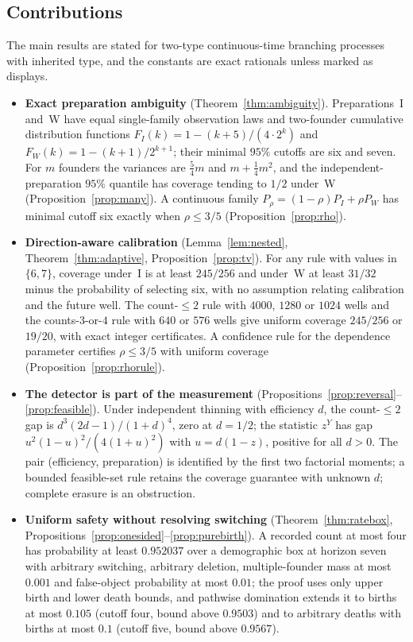 \documentclass[11pt,a4paper]{article}
\theoremstyle{plain}
\theoremstyle{definition}
\theoremstyle{remark}
\begin{document}
\subsection{Contributions}
The main results are stated for two-type continuous-time branching processes with inherited type, and the constants are exact rationals unless marked as displays.
\begin{itemize}
\item \textbf{Exact preparation ambiguity} (Theorem~\ref{thm:ambiguity}). Preparations~I and~W have equal single-family observation laws and two-founder cumulative distribution functions $F_I(k)=1-(k+5)/(4\cdot2^k)$ and $F_W(k)=1-(k+1)/2^{k+1}$; their minimal $95\%$ cutoffs are six and seven. For $m$ founders the variances are $\tfrac54 m$ and $m+\tfrac14 m^2$, and the independent-preparation $95\%$ quantile has coverage tending to $1/2$ under~W (Proposition~\ref{prop:many}). A continuous family $P_\rho=(1-\rho)P_I+\rho P_W$ has minimal cutoff six exactly when $\rho\le3/5$ (Proposition~\ref{prop:rho}).
\item \textbf{Direction-aware calibration} (Lemma~\ref{lem:nested}, Theorem~\ref{thm:adaptive}, Proposition~\ref{prop:tv}). For any rule with values in $\{6,7\}$, coverage under~I is at least $245/256$ and under~W at least $31/32$ minus the probability of selecting six, with no assumption relating calibration and the future well. The count-$\le2$ rule with $4000$, $1280$ or $1024$ wells and the counts-$3$-or-$4$ rule with $640$ or $576$ wells give uniform coverage $245/256$ or $19/20$, with exact integer certificates. A confidence rule for the dependence parameter certifies $\rho\le3/5$ with uniform coverage (Proposition~\ref{prop:rhorule}).
\item \textbf{The detector is part of the measurement} (Propositions~\ref{prop:reversal}--\ref{prop:feasible}). Under independent thinning with efficiency $d$, the count-$\le2$ gap is $d^3(2d-1)/(1+d)^4$, zero at $d=1/2$; the statistic $z^Y$ has gap $u^2(1-u)^2/(4(1+u)^2)$ with $u=d(1-z)$, positive for all $d>0$. The pair (efficiency, preparation) is identified by the first two factorial moments; a bounded feasible-set rule retains the coverage guarantee with unknown $d$; complete erasure is an obstruction.
\item \textbf{Uniform safety without resolving switching} (Theorem~\ref{thm:ratebox}, Propositions~\ref{prop:onesided}--\ref{prop:purebirth}). A recorded count at most four has probability at least $0.952037$ over a demographic box at horizon seven with arbitrary switching, arbitrary deletion, multiple-founder mass at most $0.001$ and false-object probability at most $0.01$; the proof uses only upper birth and lower death bounds, and pathwise domination extends it to births at most $0.105$ (cutoff four, bound above $0.9503$) and to arbitrary deaths with births at most $0.1$ (cutoff five, bound above $0.9567$).

\end{itemize}
\end{document}
